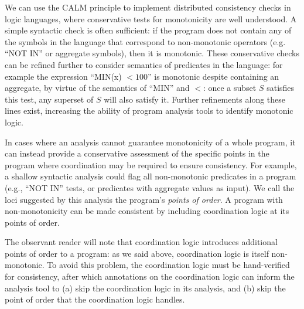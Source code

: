 We can use the CALM principle to implement distributed consistency checks in logic languages, where conservative tests for monotonicity are well understood. A simple syntactic check is often sufficient: if the program does not contain any of the symbols in the language that correspond to non-monotonic operators (e.g. ``NOT IN'' or aggregate symbols), then it is monotonic.  These conservative checks can be refined further to consider semantics of predicates in the language: for example the expression ``MIN(x) $< 100$'' is monotonic despite containing an aggregate, by virtue of the semantics of ``MIN'' and $<$: once a subset $S$ satisfies this test, any superset of $S$ will also satisfy it.  Further refinements along these lines exist, increasing the ability of program analysis tools to identify monotonic logic.
% 

In cases where an analysis cannot guarantee monotonicity of a whole program, it can instead provide a conservative assessment of the specific points in the program where coordination may be required to ensure consistency.  For example, a shallow syntactic analysis could flag all non-monotonic predicates in a program (e.g., ``NOT IN'' tests, or predicates with aggregate values as input).
We call the loci suggested by this analysis the program's \emph{points of
order}. A program with non-monotonicity can be made consistent by including coordination logic at its points of order.  

The observant reader will note that coordination logic introduces additional points of order to a program: as we said above, coordination logic is itself non-monotonic.  To avoid this problem, the coordination logic must be hand-verified for consistency, after which annotations on the coordination logic can inform the analysis tool to (a) skip the coordination logic in its analysis, and (b) skip the point of order that the coordination logic handles.  

